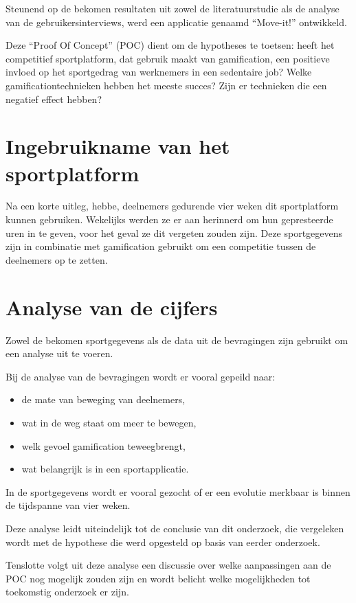 Steunend op de bekomen resultaten uit zowel de literatuurstudie als de analyse van de gebruikersinterviews, werd een applicatie genaamd ``Move-it!'' ontwikkeld.

Deze ``Proof Of Concept'' (POC) dient om de hypotheses te toetsen: heeft het competitief sportplatform, dat gebruik maakt van gamification, een positieve invloed op het sportgedrag van werknemers in een sedentaire job? Welke gamificationtechnieken hebben het meeste succes? Zijn er technieken die een negatief effect hebben?

\section{Ingebruikname van het sportplatform}


Na een korte uitleg, hebbe, deelnemers gedurende vier weken dit sportplatform kunnen gebruiken. Wekelijks werden ze er aan herinnerd om hun gepresteerde uren in te geven, voor het geval ze dit vergeten zouden zijn. Deze sportgegevens zijn in combinatie met gamification gebruikt om een competitie tussen de deelnemers op te zetten.

\section{Analyse van de cijfers}

Zowel de bekomen sportgegevens als de data uit de bevragingen zijn gebruikt om een analyse uit te voeren.

Bij de analyse van de bevragingen wordt er vooral gepeild naar:
\begin{itemize}
    \item de mate van beweging van deelnemers,
    \item wat in de weg staat om meer te bewegen,
    \item welk gevoel gamification teweegbrengt,
    \item wat belangrijk is in een sportapplicatie.
\end{itemize}

In de sportgegevens wordt er vooral gezocht of er een evolutie merkbaar is binnen de tijdspanne van vier weken.

Deze analyse leidt uiteindelijk tot de conclusie van dit onderzoek, die vergeleken wordt met de hypothese die werd opgesteld op basis van eerder onderzoek.

Tenslotte volgt uit deze analyse een discussie over welke aanpassingen aan de POC nog mogelijk zouden zijn en wordt belicht welke mogelijkheden tot toekomstig onderzoek er zijn.

